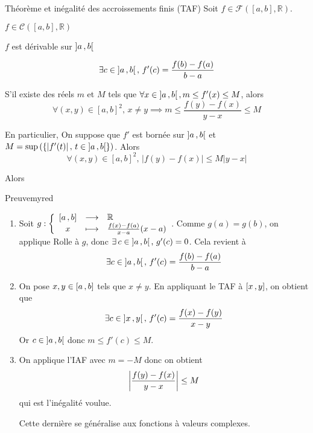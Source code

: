     \begin{theo}{Théorème et inégalité des accroissements finis (TAF)}{}
        Soit $f \in \mathcal{F}([a,b],\mathbb{R})$. 

        \begin{suppose}
            \item $f \in \mathcal{C}([a,b],\mathbb{R})$
            \item $f$ est dérivable sur $\left] a \, , b \right[$
        \end{suppose}
        \begin{alors}
            \item  
            \[\exists  c \in \left] a \, , b \right[, \, f'(c) = \frac{f(b)-f(a)}{b-a} \]
            \item S’il existe des réels $m$ et $M$ tels que $\forall x \in \left] a \, , b \right[ , m \leq f'(x) \leq M$, alors 
            \[ \forall (x,y) \in [a,b]^2, \, x \neq y \implies m \leq \frac{f(y)-f(x)}{y-x} \leq M \]
            \item \item En particulier, On suppose que $f'$ est bornée sur $\left] a \, , b \right[$ et $M = \sup \left( \left\{ \left| f'(t)\right|  , \, t \in \left] a \, , b \right[ \right\} \right)$. Alors 
            \[ \forall (x,y) \in [a,b]^2, \, \left| f(y) - f(x) \right| \leq M \left| y-x \right| \]
        \end{alors}
        Alors \[  \]
    \end{theo}

    \begin{demo}{Preuve}{myred}
        \begin{enumerate}
            \item Soit $\fonction{g}{\intervalleFF{a}{b}}{\mathbb{R}}{x}{\frac{f(x)-f(a)}{x-a}(x-a)}$. Comme $g(a) = g(b)$, on applique Rolle à $g$, donc $\exists \, c \in \left] a \, , b \right[, \, g'(c) = 0$. Cela revient à 
            \[ \exists c \in \left] a \, , b \right[, \, f'(c) = \frac{f(b)-f(a)}{b-a}\]
            \item On pose $x,y \in \left[ a \, , b \right]$ tels que $x \neq y$. En appliquant le TAF à $\left[ x \, , y \right]$, on obtient que \[ \exists c \in \left] x \, , y \right[, \, f'(c) = \frac{f(x)-f(y)}{x-y}\]
            Or $c \in \left] a \, , b \right[$ donc $ m \leq f'(c) \leq M$.
            \item On applique l’IAF avec $m = -M$ donc on obtient 
            \[ \left\lvert \frac{f(y)-f(x)}{y-x}\right\rvert \leq M \] qui est l’inégalité voulue.

            Cette dernière se généralise aux fonctions à valeurs complexes.
        \end{enumerate}  
    \end{demo}

